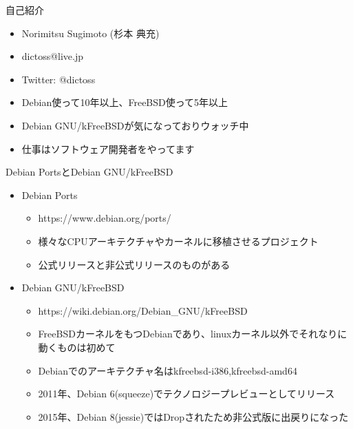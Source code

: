\begin{frame}{自己紹介}
  \begin{itemize}
  \item Norimitsu Sugimoto (杉本 典充)
  \item dictoss@live.jp
  \item Twitter: @dictoss
  \item Debian使って10年以上、FreeBSD使って5年以上
  \item Debian GNU/kFreeBSDが気になっておりウォッチ中
  \item 仕事はソフトウェア開発者をやってます
  \end{itemize}
\end{frame}


\begin{frame}[containsverbatim]{Debian PortsとDebian GNU/kFreeBSD}
  \begin{itemize}
  \item Debian Ports
    \begin{itemize}
    \item https://www.debian.org/ports/
    \item 様々なCPUアーキテクチャやカーネルに移植させるプロジェクト
    \item 公式リリースと非公式リリースのものがある
    \end{itemize}
  \item Debian GNU/kFreeBSD
    \begin{itemize}
    \item https://wiki.debian.org/Debian\_GNU/kFreeBSD
    \item FreeBSDカーネルをもつDebianであり、linuxカーネル以外でそれなりに動くものは初めて
    \item Debianでのアーキテクチャ名はkfreebsd-i386,kfreebsd-amd64
    \item 2011年、Debian 6(squeeze)でテクノロジープレビューとしてリリース
    \item 2015年、Debian 8(jessie)ではDropされたため非公式版に出戻りになった
    \end{itemize}
  \end{itemize}
\end{frame}




